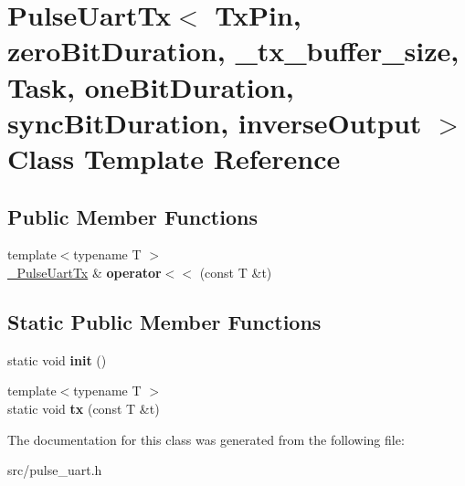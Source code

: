 \hypertarget{classPulseUartTx}{}\section{Pulse\+Uart\+Tx$<$ Tx\+Pin, zero\+Bit\+Duration, \+\_\+tx\+\_\+buffer\+\_\+size, Task, one\+Bit\+Duration, sync\+Bit\+Duration, inverse\+Output $>$ Class Template Reference}
\label{classPulseUartTx}
\subsection*{Public Member Functions}
\begin{DoxyCompactItemize}
\item 
\hypertarget{classPulseUartTx_a591f65d2a373b53cef046a0caa09f86a}{}\label{classPulseUartTx_a591f65d2a373b53cef046a0caa09f86a} 
{\footnotesize template$<$typename T $>$ }\\\hyperlink{classPulseUartTx}{\+\_\+\+Pulse\+Uart\+Tx} \& {\bfseries operator$<$$<$} (const T \&t)
\end{DoxyCompactItemize}
\subsection*{Static Public Member Functions}
\begin{DoxyCompactItemize}
\item 
\hypertarget{classPulseUartTx_afe1716e309086b7419aaca036f0e0c16}{}\label{classPulseUartTx_afe1716e309086b7419aaca036f0e0c16} 
static void {\bfseries init} ()
\item 
\hypertarget{classPulseUartTx_a5a80e32bf9c301830f710d5b8d379259}{}\label{classPulseUartTx_a5a80e32bf9c301830f710d5b8d379259} 
{\footnotesize template$<$typename T $>$ }\\static void {\bfseries tx} (const T \&t)
\end{DoxyCompactItemize}


The documentation for this class was generated from the following file\+:\begin{DoxyCompactItemize}
\item 
src/pulse\+\_\+uart.\+h\end{DoxyCompactItemize}
